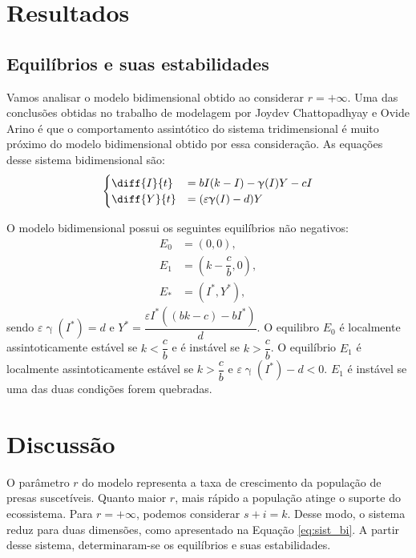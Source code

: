 \documentclass{article}
\begin{document}
\section{Resultados}
\subsection{Equilíbrios e suas estabilidades}
Vamos analisar o modelo bidimensional obtido ao considerar $r = + \infty$. Uma das conclusões obtidas no trabalho de modelagem por Joydev Chattopadhyay e Ovide Arino \cite{chattopadhyay} é que o comportamento assintótico do sistema tridimensional é muito próximo do modelo bidimensional obtido por essa consideração. As equações desse sistema bidimensional são:
\begin{equation}\label{eq:sist_bi}
\begin{split}
    \begin{cases}
    \diff{I}{t} & = bI(k - I) - \upgamma(I)Y - cI \\
    \diff{Y}{t} & = (\varepsilon \upgamma(I) - d)Y
    \end{cases}
\end{split}
\end{equation}

O modelo bidimensional possui os seguintes equilíbrios não negativos:
\begin{equation*}
\begin{split}
    E_0 & = (0,0), \\
    E_1 & = \left( k - \dfrac{c}{b}, 0 \right), \\
    E_* & = (I^*, Y^*),
\end{split}
\end{equation*}
sendo $\varepsilon \upgamma(I^*) = d$ e $Y^* = \dfrac{\varepsilon I^* ((bk - c) - bI^*)}{d}$. O equilibro $E_0$ é localmente assintoticamente estável se $k < \dfrac{c}{b}$ e é instável se $k > \dfrac{c}{b}$. O equilíbrio $E_1$ é localmente assintoticamente estável se $k > \dfrac{c}{b}$ e $\varepsilon \upgamma(I^*) - d < 0$. $E_1$ é instável se uma das duas condições forem quebradas.

\section{Discussão}
O parâmetro $r$ do modelo representa a taxa de crescimento da população de presas suscetíveis. Quanto maior $r$, mais rápido a população atinge o suporte do ecossistema. Para $r = + \infty$, podemos considerar $s + i = k$. Desse modo, o sistema reduz para duas dimensões, como apresentado na Equação \ref{eq:sist_bi}. A partir desse sistema, determinaram-se os equilíbrios e suas estabilidades. 
\end{document}
